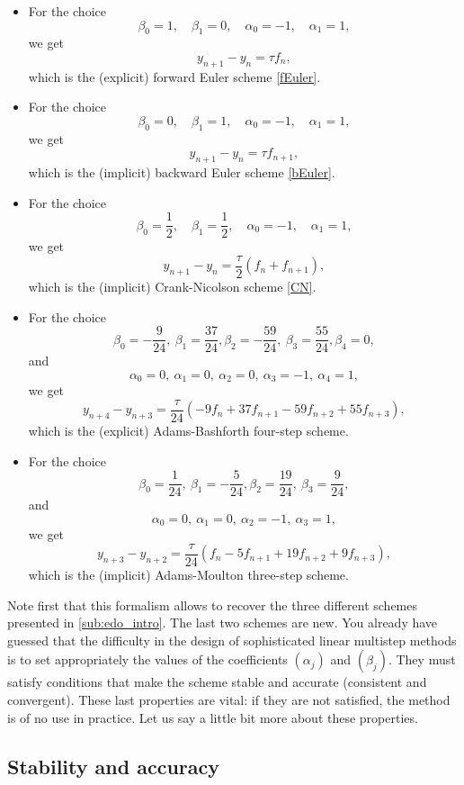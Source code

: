 \documentclass{article}
\begin{document}
\begin{itemize}
    \item For the choice
    \[
    \beta_0 = 1, \quad \beta_1 = 0, \quad \alpha_0 = -1, \quad \alpha_1 = 1,
    \]
    we get
    \[
    y_{n+1} - y_n = \tau f_n,
    \]
    which is the (explicit) forward Euler scheme \eqref{fEuler}.
    \item For the choice
    \[
    \beta_0 = 0, \quad \beta_1 = 1, \quad \alpha_0 = -1, \quad \alpha_1 = 1,
    \]
    we get
    \[
    y_{n+1} - y_n = \tau f_{n+1},
    \]
    which is the (implicit) backward Euler scheme \eqref{bEuler}.
    \item For the choice
    \[
    \beta_0 = \frac12, \quad \beta_1 = \frac12, \quad \alpha_0 = -1, \quad \alpha_1 = 1,
    \]
    we get
    \[
    y_{n+1} - y_n = \frac{\tau}{2}( f_n + f_{n+1} ),
    \]
    which is the (implicit) Crank-Nicolson scheme \eqref{CN}.
    \item For the choice
    \[
    \beta_0 = -\frac{9}{24}, \ \beta_1 = \frac{37}{24}, \beta_2= -\frac{59}{24}, \ \beta_3 = \frac{55}{24},
    \beta_4 = 0,\]
    and 
    \[
    \alpha_0 = 0, \ \alpha_1 = 0,\ \alpha_2 = 0,\  \alpha_3 = -1,\  \alpha_4 = 1,
    \]
    we get
    \[
    y_{n+4} - y_{n+3} = \frac{\tau}{24}( -9f_n + 37f_{n+1} -59f_{n+2} + 55f_{n+3}),
    \]
    which is the (explicit) Adams-Bashforth four-step scheme.
    \item For the choice
    \[
    \beta_0 = \frac{1}{24}, \ \beta_1 = -\frac{5}{24}, \beta_2= \frac{19}{24}, \ \beta_3 = \frac{9}{24},
    \]
    and 
    \[
    \alpha_0 = 0, \ \alpha_1 = 0,\ \alpha_2 = -1,\  \alpha_3 = 1,
    \]
    we get
    \[
    y_{n+3} - y_{n+2} = \frac{\tau}{24}( f_n - 5f_{n+1} + 19f_{n+2} + 9f_{n+3}),
    \]
    which is the (implicit) Adams-Moulton three-step scheme.
\end{itemize}
Note first that this formalism allows to recover the three different schemes presented in \ref{sub:edo_intro}.
The last two schemes are new. You already have guessed that the difficulty in the design of sophisticated linear multistep methods is to set appropriately the values of the coefficients $(\alpha_j)$ and $(\beta_j)$. They must satisfy conditions that make the scheme stable and accurate (consistent and convergent). These last properties are vital: if they are not satisfied, the method is of no use in practice. Let us say a little bit more about these properties.

\subsection{Stability and accuracy}
\end{document}
